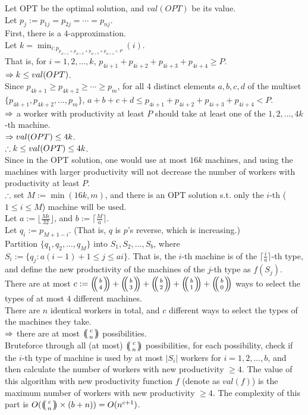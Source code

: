 \begin{pr}
Let OPT be the optimal solution, and $val(OPT)$ be its value.\\
Let $p_j:=p_{1j}=p_{2j}=\cdots=p_{nj}$.\\
First, there is a $4$-approximation.\\
Let $k=\min_{i:p_{p_{4i+1}+p_{4i+2}+p_{4i+3}+p_{4i+4}<P}}(i)$.\\
That is, for $i=1, 2, \dots, k$, $p_{4i+1}+p_{4i+2}+p_{4i+3}+p_{4i+4}\geq P$.\\
$\Rightarrow k\leq val(OPT)$.\\
Since $p_{4k+1}\geq p_{4k+2}\geq\cdots\geq p_m$, for all $4$ distinct elements $a, b, c, d$ of the multiset $\{p_{4k+1}, p_{4k+2}, \dots, p_m\}$, $a+b+c+d\leq p_{4i+1}+p_{4i+2}+p_{4i+3}+p_{4i+4}<P$.\\
$\Rightarrow$ a worker with productivity at least $P$ should take at least one of the $1, 2, \dots, 4k$-th machine.\\
$\Rightarrow val(OPT)\leq4k$.\\
$\therefore k\leq val(OPT)\leq4k$.\\
Since in the OPT solution, one would use at most $16k$ machines, and using the machines with larger productivity will not decrease the number of workers with productivity at least $P$.\\
$\therefore$ set $M:=\min(16k, m)$, and there is an OPT solution s.t. only the $i$-th ($1\leq i\leq M$) machine will be used.\\
Let $a:=\lfloor\frac{M\epsilon}{32}\rfloor$, and $b:=\lceil\frac Ma\rceil$.\\
Let $q_i:=p_{M+1-i}$. (That is, $q$ is $p$'s reverse, which is increasing.)\\
Partition $\{q_1, q_2, \dots, q_M\}$ into $S_1, S_2, \dots, S_b$, where $S_i:=\{q_j:a(i-1)+1\leq j\leq ai\}$. That is, the $i$-th machine is of the $\lceil\frac ia\rceil$-th type, and define the new productivity of the machines of the $j$-th type as $f(S_j)$.\\
There are at most $c:=\bbinom b4+\bbinom b3+\bbinom b2+\bbinom b1+\bbinom b0$ ways to select the types of at most $4$ different machines.\\
There are $n$ identical workers in total, and $c$ different ways to select the types of the machines they take.\\
$\Rightarrow$ there are at most $\bbinom cn$ possibilities.\\
Bruteforce through all (at most) $\bbinom cn$ possibilities, for each possibility, check if the $i$-th type of machine is used by at most $|S_i|$ workers for $i=1, 2, \dots, b$, and then calculate the number of workers with new productivity $\geq4$. The value of this algorithm with new productivity function $f$ (denote as $val(f)$) is the maximum number of workers with new productivity $\geq4$. The complexity of this part is $O(\bbinom cn\times(b+n))=O(n^{c+1})$.\\

\end{pr}
